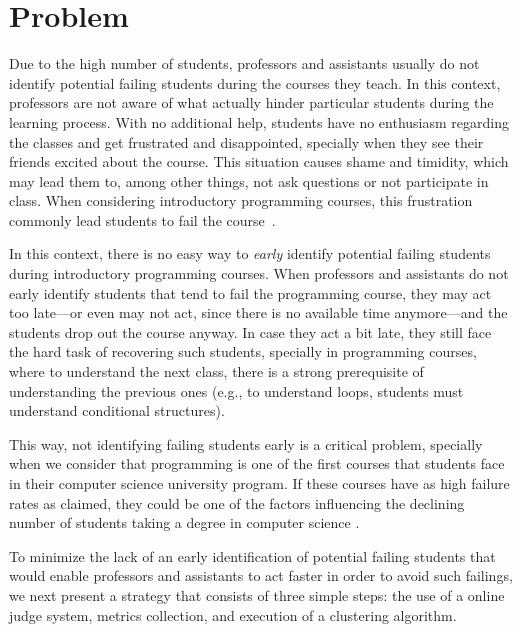 \section{Problem}

\label{sec:problem}

Due to the high number of students, professors and assistants usually do not identify potential failing students during the courses they teach. In this context, professors are not aware of what actually hinder particular students during the learning process. With no additional help, students have no enthusiasm regarding the classes and get frustrated and disappointed, specially when they see their friends excited about the course. This situation causes shame and timidity, which may lead them to, among other things, not ask questions or not participate in class. When considering introductory programming courses, this frustration commonly lead students to fail the course~\cite{}.

In this context, there is no easy way to \textit{early} identify potential failing students during introductory programming courses. When professors and assistants do not early identify students that tend to fail the programming course, they may act too late---or even may not act, since there is no available time anymore---and the students drop out the course anyway. In case they act a bit late, they still face the hard task of recovering such students, specially in programming courses, where to understand the next class, there is a strong prerequisite of understanding the previous ones (e.g., to understand loops, students must understand conditional structures). 

This way, not identifying failing students early is a critical problem, specially when we consider that programming is one of the first courses that students face in their computer science university program. If these courses have as high failure rates as claimed, they could be one of the factors influencing the declining number of students taking a degree in computer science \cite{bennedsen-sigcse}.

To minimize the lack of an early identification of potential failing students that would enable professors and assistants to act faster in order to avoid such failings, we next present a strategy that consists of three simple steps: the use of a online judge system, metrics collection, and execution of a clustering algorithm.